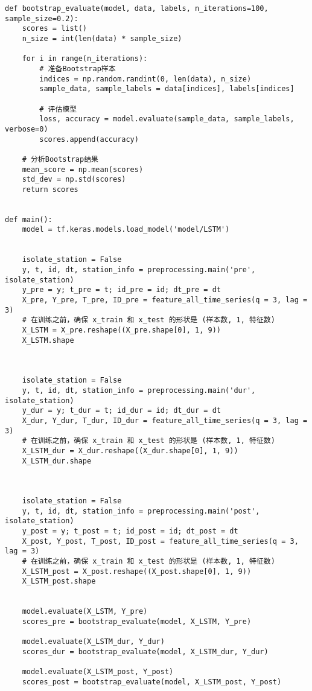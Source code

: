 \begin{lstlisting}
def bootstrap_evaluate(model, data, labels, n_iterations=100, sample_size=0.2):
    scores = list()
    n_size = int(len(data) * sample_size)
    
    for i in range(n_iterations):
        # 准备Bootstrap样本
        indices = np.random.randint(0, len(data), n_size)
        sample_data, sample_labels = data[indices], labels[indices]
        
        # 评估模型
        loss, accuracy = model.evaluate(sample_data, sample_labels, verbose=0)
        scores.append(accuracy)
    
    # 分析Bootstrap结果
    mean_score = np.mean(scores)
    std_dev = np.std(scores)
    return scores


def main():
    model = tf.keras.models.load_model('model/LSTM')
    
    
    isolate_station = False
    y, t, id, dt, station_info = preprocessing.main('pre', isolate_station)
    y_pre = y; t_pre = t; id_pre = id; dt_pre = dt
    X_pre, Y_pre, T_pre, ID_pre = feature_all_time_series(q = 3, lag = 3)
    # 在训练之前，确保 x_train 和 x_test 的形状是 (样本数, 1, 特征数)
    X_LSTM = X_pre.reshape((X_pre.shape[0], 1, 9))
    X_LSTM.shape
    
    
    
    isolate_station = False
    y, t, id, dt, station_info = preprocessing.main('dur', isolate_station)
    y_dur = y; t_dur = t; id_dur = id; dt_dur = dt
    X_dur, Y_dur, T_dur, ID_dur = feature_all_time_series(q = 3, lag = 3)
    # 在训练之前，确保 x_train 和 x_test 的形状是 (样本数, 1, 特征数)
    X_LSTM_dur = X_dur.reshape((X_dur.shape[0], 1, 9))
    X_LSTM_dur.shape
    
    
    
    isolate_station = False
    y, t, id, dt, station_info = preprocessing.main('post', isolate_station)
    y_post = y; t_post = t; id_post = id; dt_post = dt
    X_post, Y_post, T_post, ID_post = feature_all_time_series(q = 3, lag = 3)
    # 在训练之前，确保 x_train 和 x_test 的形状是 (样本数, 1, 特征数)
    X_LSTM_post = X_post.reshape((X_post.shape[0], 1, 9))
    X_LSTM_post.shape
    
    
    model.evaluate(X_LSTM, Y_pre)
    scores_pre = bootstrap_evaluate(model, X_LSTM, Y_pre)
    
    model.evaluate(X_LSTM_dur, Y_dur)
    scores_dur = bootstrap_evaluate(model, X_LSTM_dur, Y_dur)
    
    model.evaluate(X_LSTM_post, Y_post)
    scores_post = bootstrap_evaluate(model, X_LSTM_post, Y_post)
    

\end{lstlisting}
